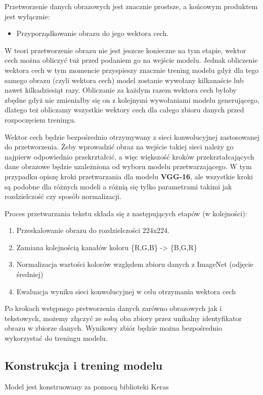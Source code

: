 
Przetworzenie danych obrazowych jest znacznie prostsze, a końcowym produktem jest wyłącznie:
\begin{itemize}
	\item Przyporządkowanie obrazu do jego wektora cech.
\end{itemize}
W teori przetworzenie obrazu nie jest jeszcze konieczne na tym etapie, wektor cech można obliczyć tuż przed podaniem go na wejście modelu. Jednak obliczenie wektora cech w tym momencie przyspieszy znacznie trening modelu gdyż dla tego samego obrazu (czyli wektora cech) model zostanie wywołany kilkanaście lub nawet kilkadziesiąt razy. Obliczanie za każdym razem wektora cech byłoby zbędne gdyż nie zmieniałby się on z kolejnymi wywołaniami modelu generującego, dlatego też obliczamy wszystkie wektory cech dla całego zbioru danych przed rozpoczęciem treningu.

Wektor cech będzie bezpośrednio otrzymywany z sieci konwolucyjnej zastosowanej do przetworzenia. Żeby wprowadzić obraz na wejście takiej sieci należy go najpierw odpowiednio przekrztałcić, a więc większość kroków przekrztałcających dane obrazowe będzie uzależniona od wyboru modelu przetwarzającego. W tym przypadku opiszę kroki przetwarzania dla modelu \textbf{VGG-16}, ale wszystkie kroki są podobne dla różnych modeli a różnią się tylko parametrami takimi jak rozdzielczość czy sposób normalizacji.

Proces przetwarzania tekstu składa się z następujących etapów (w kolejności):
\begin{enumerate}
	\item Przeskalowanie obrazu do rozdzielczości 224x224.
	\item Zamiana kolejnością kanałów koloru \{R,G,B\} -> \{B,G,R\}
	\item Normalizacja wartości kolorów względem zbioru danych z ImageNet (odjęcie średniej)
	\item Ewaluacja wyniku sieci konwolucyjnej w celu otrzymania wektora cech
\end{enumerate}

Po krokach wstępnego pretworzenia danych zarówno obrazowych jak i tekstowych, możemy złączyć ze sobą oba zbiory przez unikalny identyfikator obrazu w zbiorze danych. Wynikowy zbiór będzie można bezpośrednio wykorzystać do treningu modelu.

\subsection{Konstrukcja i trening modelu}
Model jest konstruowany za pomocą biblioteki Keras
